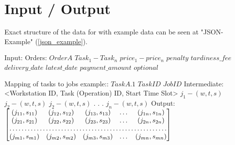 \documentclass[a4paper,12pt,twoside]{scrreprt}
\begin{document}
\section{Input / Output}
Exact structure of the data for with example data can be seen at "JSON-Example" (\autoref{json_example}).
\begin{flushleft}
	Input:\linebreak
	Orders:\linebreak
	$Order A$\linebreak
	$Task_1 - Task_n$\linebreak
	$price_1 - price_n$\linebreak
	$penalty$\linebreak
	$tardiness\_fee$\linebreak
	$delivery\_date$\linebreak
	$latest\_date$\linebreak
	$payment\_amount$\linebreak
	$optional$\linebreak
	
	Mapping of tasks to jobs example::\linebreak
	$Task A.1$\linebreak
	$Task ID$\linebreak
	$Job ID$ \linebreak\linebreak
	Intermediate:\linebreak
	<Workstation ID, Task (Operation) ID, Start Time Slot>
	$j_1 - (w, t, s)$\linebreak
	$j_2 - (w, t, s)$\linebreak
	$j_2 - (w, t, s)$\linebreak
	.\linebreak
	.\linebreak
	.\linebreak
	$j_n - (w, t, s)$\linebreak\linebreak
	Output:\linebreak
	$
	\begin{bmatrix}
		(j_{11}, s_{11}) & (j_{12}, s_{12}) & (j_{13}, s_{13}) & \dots & (j_{1n}, s_{1n})\\
		(j_{21}, s_{21}) & (j_{22}, s_{22}) & (j_{23}, s_{23}) & \dots & (j_{2n}, s_{2n})\\
		\hdotsfor{5} \\
		(j_{m1}, s_{m1}) & (j_{m2}, s_{m2}) & (j_{m3}, s_{m3}) & \dots & (j_{mn}, s_{mn})\\
	\end{bmatrix}
	$
	

\end{flushleft}
\end{document}

